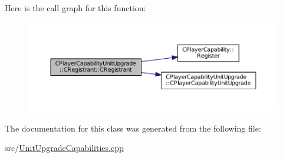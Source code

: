 Here is the call graph for this function\+:
\nopagebreak
\begin{figure}[H]
\begin{center}
\leavevmode
\includegraphics[width=350pt]{classCPlayerCapabilityUnitUpgrade_1_1CRegistrant_a8f2e3658c14746284f855fadb0bfa84d_cgraph}
\end{center}
\end{figure}


The documentation for this class was generated from the following file\+:\begin{DoxyCompactItemize}
\item 
src/\hyperlink{UnitUpgradeCapabilities_8cpp}{Unit\+Upgrade\+Capabilities.\+cpp}\end{DoxyCompactItemize}
